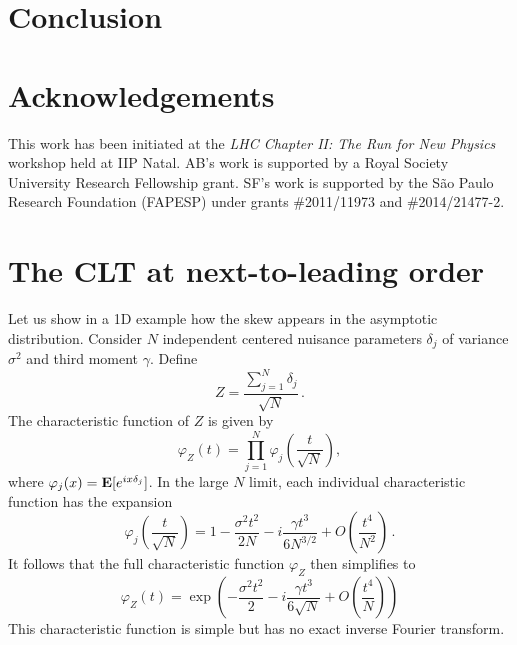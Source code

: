 \documentclass[11pt]{article}
\newcommand{\be}{\begin{equation}}
\newcommand{\ee}{\end{equation}}
\begin{document}
%


\section{Conclusion}

\section*{Acknowledgements}

 This work has been initiated at the \textit{LHC Chapter II: The Run for New Physics} workshop held at IIP Natal.
 AB's work is supported by a Royal Society University Research Fellowship grant.
 SF's work is supported by the S\~ao Paulo Research Foundation (FAPESP) under grants \#2011/11973 and \#2014/21477-2.


\appendix

\section{The CLT at next-to-leading order}
\label{app:skew}


Let us show in a 1D example how the skew appears  in the asymptotic distribution. Consider $N$ independent centered nuisance parameters $\delta_j$ of variance $\sigma^2$ and third moment $\gamma$. Define \be Z=\frac{\sum_{j=1}^N \delta_j}{\sqrt{N}}\,.
\ee
The characteristic function of $Z$ is given by
\be
\varphi_Z(t)=\prod_{j=1}^N\varphi_{j}\left(\frac{t}{\sqrt{N}}\right),
\ee
where $\varphi_{j}(x) = {\bf E}[e^{ix\delta_{j}}]$.
 In the large $N$ limit, each individual characteristic function has the expansion
\be
\varphi_{j}\left(\frac{t}{\sqrt{N}}\right)= 1-\frac{\sigma^2 t^2}{2N}-i \frac{\gamma t^3}{6 N^{3/2}} +O\left(\frac{t^4}{N^2}\right)\,.
\ee
It follows that the full characteristic function $\varphi_Z$ then simplifies to
\be
\varphi_Z(t)=\exp\left(-\frac{\sigma^2 t^2}{2}-i \frac{\gamma t^3}{6 \sqrt{N}} +O\left(\frac{t^4}{N}\right)\right) \label{eq:CF_CLT}
 \ee
 This characteristic function is simple but has no exact inverse Fourier transform.
\end{document}
